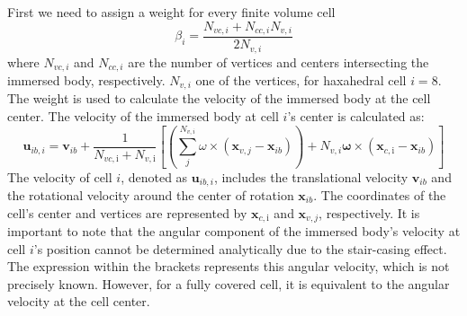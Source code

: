 First we need to assign a weight for every finite volume cell 
\begin{equation}
\beta_{i}=\frac{N_{v c, i}+N_{c c, i} N_{v, i}}{2 N_{v, i}}
\end{equation}
where $N_{v c, i}$ and $N_{c c, i} $ are the number of vertices and centers intersecting the immersed body, respectively. $N_{v, i}$ one of the vertices, for haxahedral cell $i = 8$. The weight is used to calculate the velocity of the immersed body at the cell center. The velocity of the immersed body at cell $i$'s center is calculated as:
\begin{equation} \label{IB_forces}
    \boldsymbol{u}_{i b, i} = \boldsymbol{v}_{i b}+\frac{1}{N_{v c, \mathrm{i}}+N_{v, \mathrm{i}}}\left[\left(\sum_{j}^{N_{v, i}} \omega \times\left(\boldsymbol{x}_{v, j}-\boldsymbol{x}_{i b}\right)\right)+N_{v, i} \boldsymbol{\omega} \times\left(\boldsymbol{x}_{c, \mathrm{i}}-\boldsymbol{x}_{i b}\right)\right]
\end{equation}
The velocity of cell $i$, denoted as $\boldsymbol{u}_{ib, i}$, includes the translational velocity $\boldsymbol{v}_{ib}$ and the rotational velocity around the center of rotation $\boldsymbol{x}_{ib}$. The coordinates of the cell's center and vertices are represented by $\boldsymbol{x}_{c, \mathrm{i}}$ and $\boldsymbol{x}_{v, j}$, respectively. It is important to note that the angular component of the immersed body's velocity at cell $i$'s position cannot be determined analytically due to the stair-casing effect. The expression within the brackets represents this angular velocity, which is not precisely known.
However, for a fully covered cell, it is equivalent to the angular velocity at the cell center.
